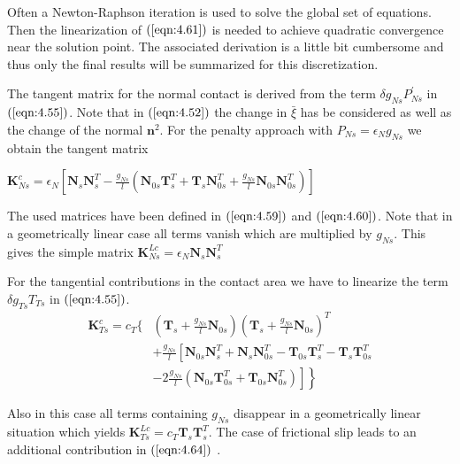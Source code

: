 Often a Newton-Raphson iteration is used to solve the global set of equations. Then the linearization of $ (\ref{eqn:4.61}) $ is needed to achieve quadratic convergence near the solution point. The associated derivation is a little bit cumbersome and thus only the final results will be summarized for this discretization. 

The tangent matrix for the normal contact is derived from the term $ \delta g_{N s} P_{N s}^{\prime} $ in $ (\ref{eqn:4.55}) $. Note that in $ (\ref{eqn:4.52}) $ the change in $ \bar{\xi} $ has be considered as well as the change of the normal $ \mathbf{n}^{2} $. For the penalty approach with $ P_{N s}=\epsilon_{N} g_{N s} $ we obtain the tangent matrix



$ \mathbf{K}_{N s}^{c}=\epsilon_{N}\left[\mathbf{N}_{s} \mathbf{N}_{s}^{T}-\frac{g_{N s}}{l}\left(\mathbf{N}_{0 s} \mathbf{T}_{s}^{T}+\mathbf{T}_{s} \mathbf{N}_{0 s}^{T}+\frac{g_{N s}}{l} \mathbf{N}_{0 s} \mathbf{N}_{0 s}^{T}\right)\right] $



The used matrices have been defined in $ (\ref{eqn:4.59}) $ and $ (\ref{eqn:4.60}) $. Note that in a geometrically linear case all terms vanish which are multiplied by $ g_{N s} . $ This gives the simple matrix $ \mathbf{K}_{N s}^{L c}=\epsilon_{N} \mathbf{N}_{s} \mathbf{N}_{s}^{T} $

For the tangential contributions in the contact area we have to linearize the term $ \delta g_{T s} T_{T s} $ in $ (\ref{eqn:4.55}) $.
\begin{equation}
 \label{eqn:4.64}   
 \begin{aligned} \mathbf{K}_{T s}^{c}=c_{T}\{&\left(\mathbf{T}_{s}+\frac{g_{N s}}{l} \mathbf{N}_{0 s}\right)\left(\mathbf{T}_{s}+\frac{g_{N s}}{l} \mathbf{N}_{0 s}\right)^{T} \\ &+\frac{g_{N s}}{l}\left[\mathbf{N}_{0 s} \mathbf{N}_{s}^{T}+\mathbf{N}_{s} \mathbf{N}_{0 s}^{T}-\mathbf{T}_{0 s} \mathbf{T}_{s}^{T}-\mathbf{T}_{s} \mathbf{T}_{0 s}^{T}\right.\\ &\left. \left.-2 \frac{g_{N s}}{l}\left(\mathbf{N}_{0 s} \mathbf{T}_{0 s}^{T}+\mathbf{T}_{0 s} \mathbf{N}_{0 s}^{T}\right)\right]\right\} \end{aligned} 
\end{equation}



Also in this case all terms containing $ g_{N s} $ disappear in a geometrically linear situation which yields $ \mathbf{K}_{T s}^{L c}=c_{T} \mathbf{T}_{s} \mathbf{T}_{s}^{T} . $ The case of frictional slip leads to an additional contribution in $ (\ref{eqn:4.64}) $ .